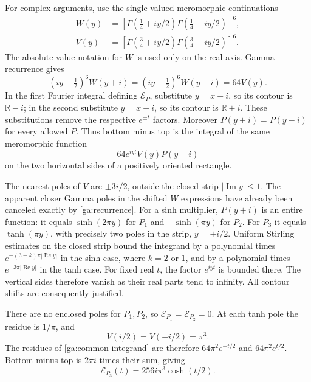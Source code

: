 \documentclass[11pt,a4paper]{article}
\theoremstyle{definition}
\theoremstyle{remark}
\numberwithin{equation}{section}
\begin{document}
For complex arguments, use the single-valued meromorphic continuations
\begin{align*}
 W(y)&=\left[\Gamma(\tfrac14+iy/2)
                       \Gamma(\tfrac14-iy/2)\right]^6,\\
 V(y)&=\left[\Gamma(\tfrac34+iy/2)
                       \Gamma(\tfrac34-iy/2)\right]^6.
\end{align*}
The absolute-value notation for $W$ is used only on the real axis.
Gamma recurrence gives
\begin{equation}\label{ga:recurrence}
 (iy-\tfrac12)^6W(y+i)
   =(iy+\tfrac12)^6W(y-i)=64V(y).
\end{equation}
In the first Fourier integral defining $\mathcal E_P$, substitute
$y=x-i$, so its contour is $\mathbb R-i$; in the second substitute
$y=x+i$, so its contour is $\mathbb R+i$.  These substitutions
remove the respective $e^{\pm t}$ factors.  Moreover
$P(y+i)=P(y-i)$ for every allowed $P$.  Thus bottom minus top
is the integral of the same meromorphic function
\begin{equation}\label{ga:common-integrand}
                  64e^{iyt}V(y)P(y+i)
\end{equation}
on the two horizontal sides of a positively oriented rectangle.

The nearest poles of $V$ are $\pm3i/2$, outside the closed strip
$|\operatorname{Im}y|\le1$.  The apparent closer Gamma poles in
the shifted $W$ expressions have already been canceled exactly
by \eqref{ga:recurrence}.  For a sinh multiplier, $P(y+i)$ is
an entire function: it equals $\sinh(2\pi y)$ for $P_1$ and
$-\sinh(\pi y)$ for $P_2$.  For $P_3$ it equals
$\tanh(\pi y)$, with precisely two poles in the strip,
$y=\pm i/2$.
Uniform Stirling estimates on the closed strip bound the integrand
by a polynomial times $e^{-(3-k)\pi|\operatorname{Re}y|}$ in
the sinh case, where $k=2$ or $1$, and by a polynomial times
$e^{-3\pi|\operatorname{Re}y|}$ in the tanh case.
For fixed real $t$, the factor $e^{iyt}$ is bounded there.
The vertical sides therefore vanish as their real parts tend to
infinity.  All contour shifts are consequently justified.

There are no enclosed poles for $P_1,P_2$, so
$\mathcal E_{P_1}=\mathcal E_{P_2}=0$.
At each tanh pole the residue is $1/\pi$, and
\[
                         V(i/2)=V(-i/2)=\pi^3.
\]
The residues of \eqref{ga:common-integrand} are therefore
$64\pi^2e^{-t/2}$ and $64\pi^2e^{t/2}$.  Bottom minus top is
$2\pi i$ times their sum, giving
\begin{equation}\label{ga:residue}
                \mathcal E_{P_3}(t)=256i\pi^3\cosh(t/2).
\end{equation}
\end{document}
